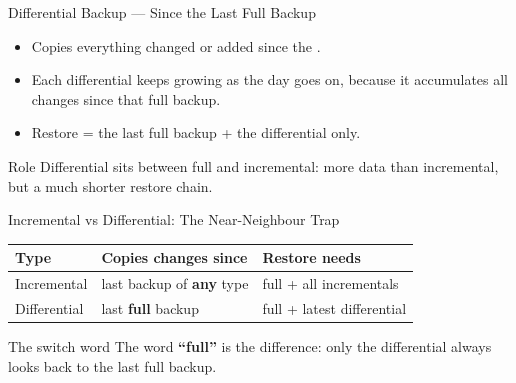 \documentclass[aspectratio=169]{beamer}
\begin{document}
\begin{frame}{Differential Backup --- Since the Last Full Backup}
  \begin{itemize}
    \item Copies everything changed or added since the .
    \item Each differential keeps growing as the day goes on, because it
      accumulates all changes since that full backup.
    \item Restore = the last full backup + the  differential
      only.
  \end{itemize}
  \begin{block}{Role}
    Differential sits between full and incremental: more data than
    incremental, but a much shorter restore chain.
  \end{block}
\end{frame}

\begin{frame}{Incremental vs Differential: The Near-Neighbour Trap}
  \begin{center}
    \begin{tabular}{lll}
      \toprule
      \textbf{Type} & \textbf{Copies changes since} & \textbf{Restore needs} \\
      \midrule
      Incremental & last backup of \textbf{any} type & full + all incrementals \\
      Differential & last \textbf{full} backup & full + latest differential \\
      \bottomrule
    \end{tabular}
  \end{center}
  \vspace{0.3cm}
  \begin{alertblock}{The switch word}
    The word \textbf{``full''} is the difference: only the differential
    always looks back to the last full backup.
  \end{alertblock}
\end{frame}
\end{document}
